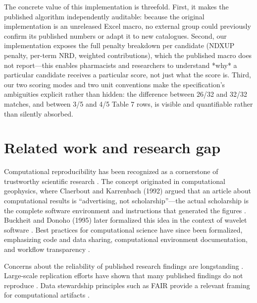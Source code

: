 \documentclass[12pt]{article}
\begin{document}
The concrete value of this implementation is threefold. First, it makes the published algorithm independently auditable: because the original implementation is an unreleased Excel macro, no external group could previously confirm its published numbers or adapt it to new catalogues. Second, our implementation exposes the full penalty breakdown per candidate (NDXUP penalty, per-term NRD, weighted contributions), which the published macro does not report---this enables pharmacists and researchers to understand *why* a particular candidate receives a particular score, not just what the score is. Third, our two scoring modes and two unit conventions make the specification's ambiguities explicit rather than hidden: the difference between 26/32 and 32/32 matches, and between 3/5 and 4/5 Table 7 rows, is visible and quantifiable rather than silently absorbed.

\section{Related work and research gap}
\label{sec:related}

Computational reproducibility has been recognized as a cornerstone of trustworthy scientific research \citep{nationalacademies2019reproducibility,peng2011reproducible,peng2006reproducible}. The concept originated in computational geophysics, where Claerbout and Karrenbach (1992) argued that an article about computational results is ``advertising, not scholarship''---the actual scholarship is the complete software environment and instructions that generated the figures \citep{claerbout1992electronic}. Buckheit and Donoho (1995) later formalized this idea in the context of wavelet software \citep{buckheit1995wavelab}. Best practices for computational science have since been formalized, emphasizing code and data sharing, computational environment documentation, and workflow transparency \citep{stodden2014reproducible,stodden2014best,wilson2014best,taschuk2017ten,wilson2017good}.

Concerns about the reliability of published research findings are longstanding \citep{ioannidis2005false}. Large-scale replication efforts have shown that many published findings do not reproduce \citep{nosek2015estimating}. Data stewardship principles such as FAIR provide a relevant framing for computational artifacts \citep{wilkinson2016fair}.
\end{document}
